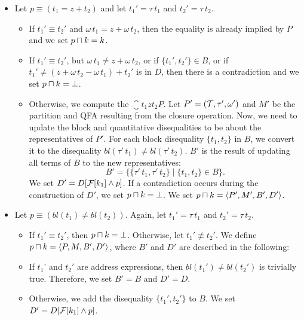 \begin{itemize}
    \item Let $p \equiv (t_1 = z + t_2)$ and let $t_1'=\tau\,t_1$ and $t_2'=\tau\,t_2$.
          \begin{itemize}
              \item If $t_1' \equiv t_2'$ and $\omega\,t_1 = z + \omega\,t_2$,
                    then the equality is already implied by $P$ and we set $p \sqcap k = k$.
              \item If $t_1' \equiv t_2'$, but $\omega\,t_1 \neq z + \omega\,t_2$,
                    or if $\{t_1',t_2'\}\in B$, or if $t_1' \neq (z + \omega\,t_2 - \omega\,t_1) + t_2'$ is in $D$,
                    then there is a contradiction and we set $p \sqcap k = \bot$.
              \item Otherwise, we compute the $\closure{t_1}{z}{t_2}{P}$.
                    Let $P' = (\mathcal{T}, \tau', \omega')$ and $M'$ be the partition and QFA resulting from the closure operation.
                    Now, we need to update the block and quantitative disequalities to be about the representatives of $P'$.
                    For each block disequality $\{t_1,t_2\}$ in $B$, we convert it to the disequality $bl(\tau'\,t_1) \neq bl(\tau'\,t_2)$.
                    $B'$ is the result of updating all terms of $B$ to the new representatives:
                    \[
                        B' = \{\{\tau'\,t_1, \tau'\,t_2\} \mid \{t_1,t_2\} \in B\}.
                    \]
                    We set $D' = D[\mathcal{F}[k_1] \land p]$.
                    If a contradiction occurs during the construction of $D'$, we set $p \sqcap k = \bot$.
                    We set $p \sqcap k = \langle P',M',B',D'\rangle$.
          \end{itemize}
    \item Let $p \equiv (bl(t_1) \neq bl(t_2))$. Again, let $t_1'=\tau\,t_1$ and $t_2'=\tau\,t_2$.
          \begin{itemize}
              \item If $t_1' \equiv t_2'$, then $p \sqcap k = \bot$.
                    Otherwise, let $t_1' \nequiv t_2'$. We define $p \sqcap k = \langle P,M,B', D'\rangle$, where $B'$ and $D'$ are described in the following:
              \item If $t_1$' and $t_2'$ are address expressions, then $bl(t_1') \neq bl(t_2')$ is trivially true.
                    Therefore, we set $B'= B$ and $D'=D$.
              \item Otherwise, we add the disequality $\{t_1',t_2'\}$ to $B$.
                    We set $D' = D[\mathcal{F}[k_1] \land p]$.

\end{itemize}
\end{itemize}
